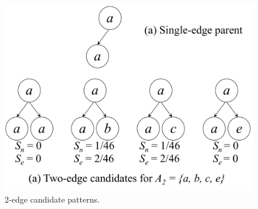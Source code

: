 \begin{figure}[h!]
\centering
    \includegraphics[scale=0.15]{figures/example_2-edge.pdf}
    \caption{2-edge candidate patterns.}
    \label{fig:example_2-edge}  
\end{figure}

